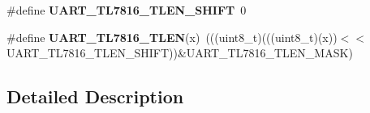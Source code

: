 \begin{DoxyCompactItemize}
\item 
\#define {\bfseries U\+A\+R\+T\+\_\+\+T\+L7816\+\_\+\+T\+L\+E\+N\+\_\+\+S\+H\+I\+FT}~0\hypertarget{group__UART__Register__Masks_gaafcee96c5728fbbbc56c3b2ea55bd753}{}\label{group__UART__Register__Masks_gaafcee96c5728fbbbc56c3b2ea55bd753}

\item 
\#define {\bfseries U\+A\+R\+T\+\_\+\+T\+L7816\+\_\+\+T\+L\+EN}(x)~(((uint8\+\_\+t)(((uint8\+\_\+t)(x))$<$$<$U\+A\+R\+T\+\_\+\+T\+L7816\+\_\+\+T\+L\+E\+N\+\_\+\+S\+H\+I\+FT))\&U\+A\+R\+T\+\_\+\+T\+L7816\+\_\+\+T\+L\+E\+N\+\_\+\+M\+A\+SK)\hypertarget{group__UART__Register__Masks_gaf537ccbe6ddd913ae8f3a988393519e4}{}\label{group__UART__Register__Masks_gaf537ccbe6ddd913ae8f3a988393519e4}

\end{DoxyCompactItemize}


\subsection{Detailed Description}
